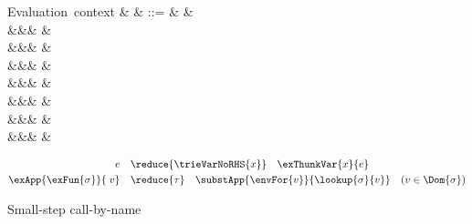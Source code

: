 \begin{figure}[H]
\begingroup
\renewcommand*{\arraystretch}{1.2}
\begin{syntaxfig}
\mbox{Evaluation context}
&
\evalCxt{\Ev}{\sigma}
&
::=
&
\evalCxt{\hole}{\sigma}
&
\\
&&&
&
\\
&&&
\evalCxt{(\exApp{\exFun{\sigma}}{\;\evalCxt{\Ev}{\sigma}})}{\tau}
&
\\
&&&
&
\\
&&&
&
\\
&&&
&
\\
&&&
&
\\
&&&
\evalCxt{(\exRoll{\evalCxt{\Ev}{\sigma}})}{\trieRoll{\sigma}}
&
\end{syntaxfig}
\endgroup

\noindent {}
{\small
\begin{align*}
e
&
\quad \reduce{\trieVarNoRHS{x}} \quad
\exThunkVar{x}{e}
\\
\exApp{\exFun{\sigma}}{\;v}
&
\quad \reduce{\tau} \quad
\substApp{\envFor{v}}{\lookup{\sigma}{v}}
&
(v \in \Dom{\sigma})
\end{align*}
}
\begin{smathpar}
{
  \reduce{}
}
\end{smathpar}
\caption{Small-step call-by-name}
\label{fig:reduce:call-by-name}
\end{figure}
